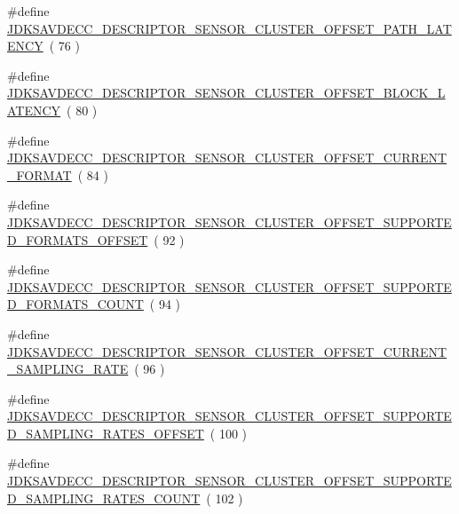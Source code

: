 \begin{DoxyCompactItemize}
\#define \hyperlink{group__descriptor__sensor__cluster_gacff2b35d65c59c992288a38abedfb148}{J\+D\+K\+S\+A\+V\+D\+E\+C\+C\+\_\+\+D\+E\+S\+C\+R\+I\+P\+T\+O\+R\+\_\+\+S\+E\+N\+S\+O\+R\+\_\+\+C\+L\+U\+S\+T\+E\+R\+\_\+\+O\+F\+F\+S\+E\+T\+\_\+\+P\+A\+T\+H\+\_\+\+L\+A\+T\+E\+N\+CY}~( 76 )
\item 
\#define \hyperlink{group__descriptor__sensor__cluster_ga0d5bdf8965785ccb1631bdce27c740f5}{J\+D\+K\+S\+A\+V\+D\+E\+C\+C\+\_\+\+D\+E\+S\+C\+R\+I\+P\+T\+O\+R\+\_\+\+S\+E\+N\+S\+O\+R\+\_\+\+C\+L\+U\+S\+T\+E\+R\+\_\+\+O\+F\+F\+S\+E\+T\+\_\+\+B\+L\+O\+C\+K\+\_\+\+L\+A\+T\+E\+N\+CY}~( 80 )
\item 
\#define \hyperlink{group__descriptor__sensor__cluster_gaf4e02d4587749afb79b55e67e65c9021}{J\+D\+K\+S\+A\+V\+D\+E\+C\+C\+\_\+\+D\+E\+S\+C\+R\+I\+P\+T\+O\+R\+\_\+\+S\+E\+N\+S\+O\+R\+\_\+\+C\+L\+U\+S\+T\+E\+R\+\_\+\+O\+F\+F\+S\+E\+T\+\_\+\+C\+U\+R\+R\+E\+N\+T\+\_\+\+F\+O\+R\+M\+AT}~( 84 )
\item 
\#define \hyperlink{group__descriptor__sensor__cluster_gaf24d1ea927c9680ff48b2fe2ea2592aa}{J\+D\+K\+S\+A\+V\+D\+E\+C\+C\+\_\+\+D\+E\+S\+C\+R\+I\+P\+T\+O\+R\+\_\+\+S\+E\+N\+S\+O\+R\+\_\+\+C\+L\+U\+S\+T\+E\+R\+\_\+\+O\+F\+F\+S\+E\+T\+\_\+\+S\+U\+P\+P\+O\+R\+T\+E\+D\+\_\+\+F\+O\+R\+M\+A\+T\+S\+\_\+\+O\+F\+F\+S\+ET}~( 92 )
\item 
\#define \hyperlink{group__descriptor__sensor__cluster_ga83eb7be7a50f27261def3a9cb1f44533}{J\+D\+K\+S\+A\+V\+D\+E\+C\+C\+\_\+\+D\+E\+S\+C\+R\+I\+P\+T\+O\+R\+\_\+\+S\+E\+N\+S\+O\+R\+\_\+\+C\+L\+U\+S\+T\+E\+R\+\_\+\+O\+F\+F\+S\+E\+T\+\_\+\+S\+U\+P\+P\+O\+R\+T\+E\+D\+\_\+\+F\+O\+R\+M\+A\+T\+S\+\_\+\+C\+O\+U\+NT}~( 94 )
\item 
\#define \hyperlink{group__descriptor__sensor__cluster_gabbf631ccca8465a7fb160d242fb3cb85}{J\+D\+K\+S\+A\+V\+D\+E\+C\+C\+\_\+\+D\+E\+S\+C\+R\+I\+P\+T\+O\+R\+\_\+\+S\+E\+N\+S\+O\+R\+\_\+\+C\+L\+U\+S\+T\+E\+R\+\_\+\+O\+F\+F\+S\+E\+T\+\_\+\+C\+U\+R\+R\+E\+N\+T\+\_\+\+S\+A\+M\+P\+L\+I\+N\+G\+\_\+\+R\+A\+TE}~( 96 )
\item 
\#define \hyperlink{group__descriptor__sensor__cluster_gabb96eb9f7951cc8467be9820bd5f6779}{J\+D\+K\+S\+A\+V\+D\+E\+C\+C\+\_\+\+D\+E\+S\+C\+R\+I\+P\+T\+O\+R\+\_\+\+S\+E\+N\+S\+O\+R\+\_\+\+C\+L\+U\+S\+T\+E\+R\+\_\+\+O\+F\+F\+S\+E\+T\+\_\+\+S\+U\+P\+P\+O\+R\+T\+E\+D\+\_\+\+S\+A\+M\+P\+L\+I\+N\+G\+\_\+\+R\+A\+T\+E\+S\+\_\+\+O\+F\+F\+S\+ET}~( 100 )
\item 
\#define \hyperlink{group__descriptor__sensor__cluster_ga1e041e239c5e2f4f53fc5944a0ffb076}{J\+D\+K\+S\+A\+V\+D\+E\+C\+C\+\_\+\+D\+E\+S\+C\+R\+I\+P\+T\+O\+R\+\_\+\+S\+E\+N\+S\+O\+R\+\_\+\+C\+L\+U\+S\+T\+E\+R\+\_\+\+O\+F\+F\+S\+E\+T\+\_\+\+S\+U\+P\+P\+O\+R\+T\+E\+D\+\_\+\+S\+A\+M\+P\+L\+I\+N\+G\+\_\+\+R\+A\+T\+E\+S\+\_\+\+C\+O\+U\+NT}~( 102 )

\end{DoxyCompactItemize}
